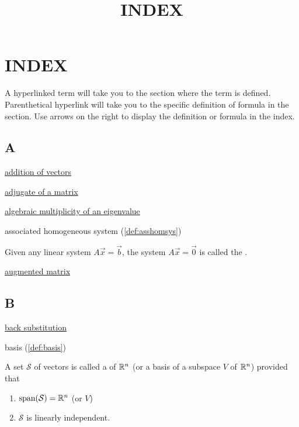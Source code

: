 \documentclass{ximera}
\title{INDEX} \license{CC BY-NC-SA 4.0}
\begin{document}
\begin{abstract}
\end{abstract}
\maketitle



\section{INDEX}
A hyperlinked term will take you to the section where the term is defined.  Parenthetical hyperlink will take you to the specific definition of formula in the section.  Use arrows on the right to display the definition or formula in the index.
\subsection{A}
\href{https://ximera.osu.edu/oerlinalg/LinearAlgebra/VEC-0030/main}{addition of vectors}


\href{https://ximera.osu.edu/oerlinalg/LinearAlgebra/DET-0060/main}{adjugate of a matrix}

\href{https://ximera.osu.edu/oerlinalg/LinearAlgebra/EIG-0020/main}{algebraic multiplicity of an eigenvalue}

associated homogeneous system (\ref{def:asshomsys})
\begin{expandable}
    Given any linear system $A\vec{x}=\vec{b}$, the system $A\vec{x}=\vec{0}$ is called the .
\end{expandable}

\href{https://ximera.osu.edu/oerlinalg/LinearAlgebra/SYS-0020/main}{augmented matrix}


\subsection{B}

\href{https://ximera.osu.edu/oerlinalg/LinearAlgebra/SYS-0020/main}{back substitution}

basis (\ref{def:basis})
\begin{expandable}
    A set $\mathcal{S}$ of vectors is called a  of $\mathbb{R}^n$ (or a basis of a subspace $V$ of $\mathbb{R}^n$) provided that 
\begin{enumerate}
\item 
$\mbox{span}(\mathcal{S})=\mathbb{R}^n$ (or $V$)
\item 
$\mathcal{S}$ is linearly independent.
\end{enumerate}
\end{expandable}
\end{document}
